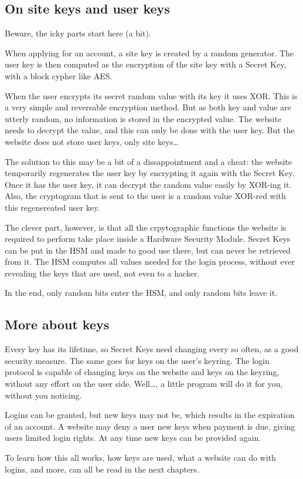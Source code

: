 \subsection{On site keys and user keys}
Beware, the icky parts start here (a bit).
\par
When applying for an account, a site key is created by a random generator.
The user key is then computed as the encryption of the site key with a Secret Key, with a block cypher like AES.
\par
When the user encrypts its secret random value with its key it uses XOR.
This is a very simple and reversable encryption method.
But as both key and value are utterly random, no information is stored in the encrypted value.
The website needs to decrypt the value, and this can only be done with the user key.
But the website does not store user keys, only site keys\ldots
\par
The solution to this may be a bit of a dissappointment and a cheat:
the website temporarily regenerates the user key by encrypting it again with the Secret Key.
Once it has the user key, it can decrypt the random value easily by XOR-ing it.
Also, the cryptogram that is sent to the user is a random value XOR-red with this regenereated user key.
\par
The clever part, however, is that all the crpytographic functions the website is required to perform take place inside a Hardware Security Module.
Secret Keys can be put in the HSM and made to good use there, but can never be retrieved from it.
The HSM computes all values needed for the login process,
without ever revealing the keys that are used, not even to a hacker.
\par
In the end,
only random bits enter the HSM,
and only random bits leave it.
\subsection{More about keys}
Every key has its lifetime, so Secret Keys need changing every so often, as a good security measure.
The same goes for keys on the user's keyring.
The login protocol is capable of changing keys on the website and keys on the keyring,
without any effort on the user side.
Well\ldots, a little program will do it for you, without you noticing.
\par
Logins can be granted,
but new keys may not be,
which results in the expiration of an account.
A website may deny a user new keys when payment is due,
giving users limited login rights.
At any time new keys can be provided again.
\par
\par
To learn how this all works,
how keys are used,
what a website can do with logins,
and more,
can all be read in the next chapters.
\clearpage
